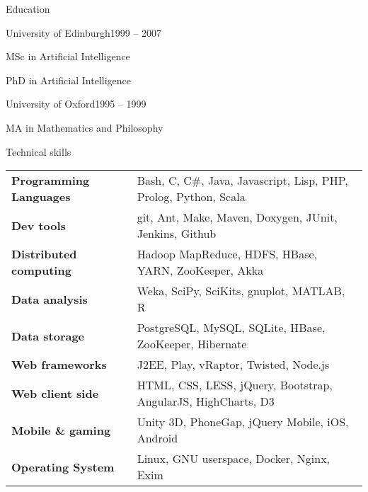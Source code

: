 \documentclass{resume} %
\begin{document}

\begin{rSection}{Education}
\begin{rSubsection}{University of Edinburgh}{1999 -- 2007}{}{}
\item MSc in Artificial Intelligence
\item PhD in Artificial Intelligence
\end{rSubsection}

\begin{rSubsection}{University of Oxford}{1995 -- 1999}{}{}
\item MA in Mathematics and Philosophy
\end{rSubsection}
\end{rSection}


\begin{rSection}{Technical skills}

\begin{tabular}{ @{} >{\bfseries}l @{\hspace{6ex}} l }
Programming Languages & Bash, C, C\#, Java, Javascript, Lisp, PHP, Prolog, Python, Scala \\
Dev tools & git, Ant, Make, Maven, Doxygen, JUnit, Jenkins, Github \\
Distributed computing & Hadoop MapReduce, HDFS, HBase, YARN, ZooKeeper, Akka \\
Data analysis & Weka, SciPy, SciKits, gnuplot, MATLAB, R \\
Data storage & PostgreSQL, MySQL, SQLite, HBase, ZooKeeper, Hibernate \\
Web frameworks & J2EE, Play, vRaptor, Twisted, Node.js \\
Web client side & HTML, CSS, LESS, jQuery, Bootstrap, AngularJS, HighCharts, D3 \\
Mobile \& gaming & Unity 3D, PhoneGap, jQuery Mobile, iOS, Android \\
Operating System & Linux, GNU userspace, Docker, Nginx, Exim \\
\end{tabular}

\end{rSection}
\end{document}
